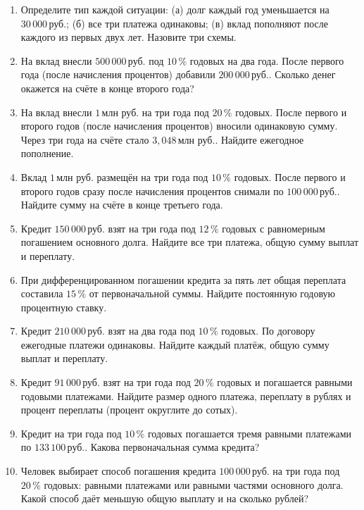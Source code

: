\documentclass[a4paper,12pt]{article}
\newcommand{\rub}{\,\text{руб.}}
\newcommand{\mln}{\,\text{млн руб.}}
\newcommand{\pct}{\,\%}
\begin{document}
\begin{enumerate}
\item Определите тип каждой ситуации: (а) долг каждый год уменьшается на $30\,000\rub$; (б) все три платежа одинаковы; (в) вклад пополняют после каждого из первых двух лет. Назовите три схемы.

\item На вклад внесли $500\,000\rub$ под $10\pct$ годовых на два года. После первого года (после начисления процентов) добавили $200\,000\rub$. Сколько денег окажется на счёте в конце второго года?

\item На вклад внесли $1\mln$ на три года под $20\pct$ годовых. После первого и второго годов (после начисления процентов) вносили одинаковую сумму. Через три года на счёте стало $3{,}048\mln$. Найдите ежегодное пополнение.

\item Вклад $1\mln$ размещён на три года под $10\pct$ годовых. После первого и второго годов сразу после начисления процентов снимали по $100\,000\rub$. Найдите сумму на счёте в конце третьего года.

\item Кредит $150\,000\rub$ взят на три года под $12\pct$ годовых с равномерным погашением основного долга. Найдите все три платежа, общую сумму выплат и переплату.

\item При дифференцированном погашении кредита за пять лет общая переплата составила $15\pct$ от первоначальной суммы. Найдите постоянную годовую процентную ставку.

\item Кредит $210\,000\rub$ взят на два года под $10\pct$ годовых. По договору ежегодные платежи одинаковы. Найдите каждый платёж, общую сумму выплат и переплату.

\item Кредит $91\,000\rub$ взят на три года под $20\pct$ годовых и погашается равными годовыми платежами. Найдите размер одного платежа, переплату в рублях и процент переплаты (процент округлите до сотых).

\item Кредит на три года под $10\pct$ годовых погашается тремя равными платежами по $133\,100\rub$. Какова первоначальная сумма кредита?

\item Человек выбирает способ погашения кредита $100\,000\rub$ на три года под $20\pct$ годовых: равными платежами или равными частями основного долга. Какой способ даёт меньшую общую выплату и на сколько рублей?
\end{enumerate}
\clearpage
\end{document}
